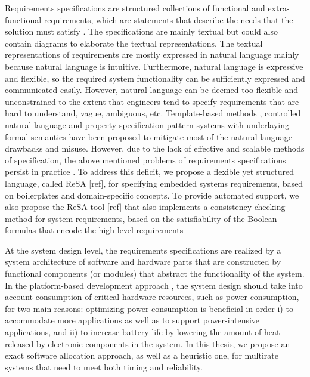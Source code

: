 Requirements specifications are structured collections of functional and extra-functional requirements, which are statements that describe the needs that the solution must satisfy \cite{ieereqspecstandard}. The specifications are mainly textual but could also contain diagrams to elaborate the textual representations. The textual representations of requirements are mostly expressed in natural language mainly because natural language is intuitive. Furthermore, natural language is expressive and flexible, so the required system functionality can be sufficiently expressed and communicated easily. However, natural language can be deemed too flexible and unconstrained to the extent that engineers tend to specify requirements that are hard to understand, vague, ambiguous, etc. Template-based methods \cite{Hull2011RequirementsEngineering}, controlled natural language  \cite{attempto96,Schwitter2002EnglishLanguage} and property specification pattern systems with underlaying formal semantics  \cite{Gruhn2006PatternsSpecifications,Konrad2005Real-timePatterns,Post2012AutomotiveBOSCH,Filipovikj2014ReassessingDomain} have been proposed to mitigate most of the natural language drawbacks and misuse. However, due to the lack of effective and scalable methods of specification, the above mentioned problems of requirements specifications persist in practice \cite{Sikora2011RequirementsNeeds}. To address this deficit, we propose a flexible yet structured language, called ReSA [ref], for specifying embedded systems requirements, based on boilerplates and domain-specific concepts. To provide automated support, we also propose the ReSA tool [ref] that also implements a  consistency checking method for system requirements, based on the satisfiability of the Boolean formulas that encode the high-level requirements

At the system design level, the requirements specifications are realized by a system architecture of software and hardware parts that are constructed by functional components (or modules) that abstract the functionality of the system. In the platform-based development approach \cite{Sangiovanni-Vincentelli2004BenefitsDesign}, the system design should take into account consumption of critical hardware resources, such as power consumption, for two main reasons: optimizing power consumption is beneficial in order i) to accommodate more applications as well as to support power-intensive applications, and ii) to increase battery-life by lowering the amount of heat released by electronic components in the system. In this thesis, we propose an exact software allocation approach, as well as a heuristic one, for multirate systems that need to meet both timing and reliability. 

